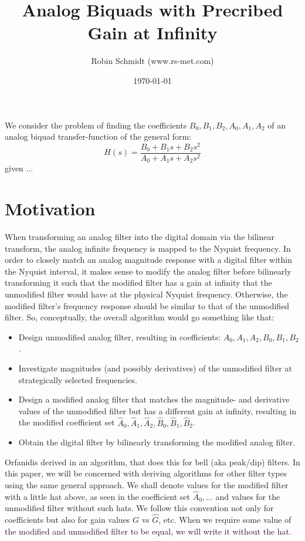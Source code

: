 \title{Analog Biquads with Precribed Gain at Infinity}
\author{Robin Schmidt (www.rs-met.com)}
\date{\today}
\maketitle

We consider the problem of finding the coefficients $B_0, B_1, B_2, A_0, A_1, A_2$ of an analog biquad transfer-function of the general form:
\begin{equation}
\label{Eq:TransferFunctionBiquad}
 H(s) = \frac{B_0 + B_1 s + B_2 s^2}{A_0 + A_1 s + A_2 s^2}
\end{equation}
given ...



\section{Motivation}
When transforming an analog filter into the digital domain via the bilinear transform, the analog infinite frequency is mapped to the Nyquist frequency. In order to closely match an analog magnitude response with a digital filter within the Nyquist interval, it makes sense to modify the analog filter before bilinearly transforming it such that the modified filter has a gain at infinity that the unmodified filter would have at the physical Nyquist frequency. Otherwise, the modified filter's frequency response should be similar to that of the unmodified filter. So, conceptually, the overall algorithm would go something like that:
\begin{itemize}
	\item Design unmodified analog filter, resulting in coefficients: $A_0, A_1, A_2, B_0, B_1, B_2$.
	\item Investigate magnitudes (and possibly derivatives) of the unmodified filter at strategically selected frequencies.
	\item Design a modified analog filter that matches the magnitude- and derivative values of the unmodified filter but has a different gain at infinity, resulting in the modified coefficient set $\hat{A}_0, \hat{A}_1, \hat{A}_2, \hat{B}_0, \hat{B}_1, \hat{B}_2$.
	\item Obtain the digital filter by bilinearly transforming the modified analog filter.
\end{itemize}
Orfanidis derived in \cite{Orf} an algorithm, that does this for bell (aka peak/dip) filters. In this paper, we will be concerned with deriving algorithms for other filter types using the same general approach. We shall denote values for the modified filter with a little hat above, as seen in the coefficient set $\hat{A}_0, \ldots$ and values for the unmodified filter without such hats. We follow this convention not only for coefficients but also for gain values $G$ vs $\hat{G}$, etc. When we require some value of the modified and unmodified filter to be equal, we will write it without the hat.


